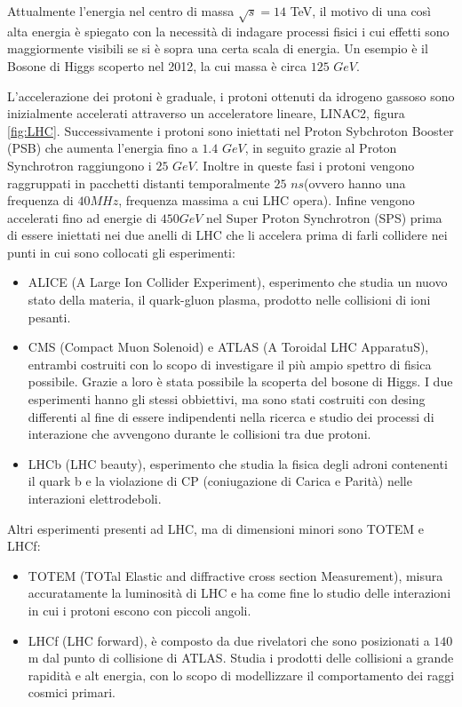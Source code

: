 Attualmente l'energia nel centro di massa $\sqrt{s}=14$ TeV, il motivo di una così alta energia è spiegato con la necessità di indagare processi fisici i cui effetti sono maggiormente visibili se si è sopra una certa scala di energia. Un esempio è il Bosone di Higgs scoperto nel 2012, la cui massa è circa $125$ $GeV$.

L'accelerazione dei protoni è graduale, i protoni ottenuti da idrogeno gassoso sono inizialmente accelerati attraverso un acceleratore lineare, LINAC2, figura \ref{fig:LHC}. Successivamente i protoni sono iniettati nel Proton Sybchroton Booster (PSB) che aumenta l'energia fino a $1.4$ $GeV$, in seguito grazie al Proton Synchrotron raggiungono i $25$ $GeV$. 
Inoltre in queste fasi i protoni vengono raggruppati in pacchetti distanti temporalmente $25$ $ns$(ovvero hanno una frequenza di $40 MHz$, frequenza massima a cui LHC opera). 
Infine vengono accelerati fino ad energie di $450 GeV$ nel Super Proton Synchrotron (SPS) prima di essere iniettati nei due anelli di LHC che li accelera prima di farli collidere nei punti in cui sono collocati gli esperimenti:

\begin{itemize}
\item ALICE (A Large Ion Collider Experiment), esperimento che studia un nuovo stato della materia, il quark-gluon plasma, prodotto nelle collisioni di ioni pesanti.

\item CMS (Compact Muon Solenoid) e ATLAS (A Toroidal LHC ApparatuS), entrambi costruiti con lo scopo di investigare il più ampio spettro di fisica possibile. Grazie a loro è stata possibile la scoperta del bosone di Higgs. I due esperimenti hanno gli stessi obbiettivi, ma sono stati costruiti con desing differenti al fine di essere indipendenti nella ricerca e studio dei processi di interazione che avvengono durante le collisioni tra due protoni.

\item LHCb (LHC beauty), esperimento che studia la fisica degli adroni contenenti il quark b e la violazione di CP (coniugazione di Carica e Parità) nelle interazioni elettrodeboli.
\end{itemize}

Altri esperimenti presenti ad LHC, ma di dimensioni minori sono TOTEM e LHCf:

\begin{itemize}
\item TOTEM (TOTal Elastic and diffractive cross section Measurement), misura accuratamente la luminosità di LHC e ha come fine lo studio delle interazioni in cui i protoni escono con piccoli angoli.

\item LHCf (LHC forward), è composto da due rivelatori che sono posizionati a $140$ m dal punto di collisione di ATLAS. Studia i prodotti delle collisioni a grande rapidità e alt energia, con lo scopo di modellizzare il comportamento dei raggi cosmici primari.
\end{itemize}


